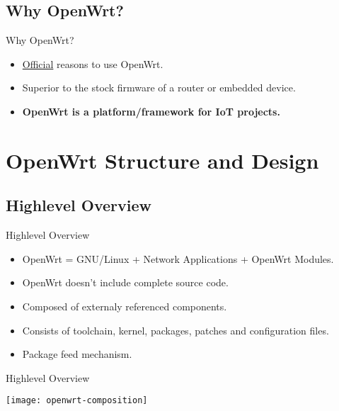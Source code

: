\subsection{Why OpenWrt?}
\begin{frame}{Why OpenWrt?}
    \pause
    \begin{itemize}[<+-|alert@+>]
        \item \href{https://openwrt.org/reasons_to_use_lede}{Official} reasons to use OpenWrt.
        \item Superior to the stock firmware of a router or embedded device.
        \item \textbf{OpenWrt is a platform/framework for IoT projects.}
    \end{itemize}
\end{frame}

\section{OpenWrt Structure and Design}

\subsection{Highlevel Overview}
\begin{frame}{Highlevel Overview}
    \pause
    \begin{itemize}[<+-|alert@+>]
        \item OpenWrt = GNU/Linux + Network Applications + OpenWrt Modules.
        \item OpenWrt doesn't include complete source code.
        \item Composed of externaly referenced components.
        \item Consists of toolchain, kernel, packages, patches and configuration files.
        \item Package feed mechanism.
    \end{itemize}
\end{frame}

\begin{frame}{Highlevel Overview}
    \centerline{\texttt{[image: openwrt-composition]}}
\end{frame}


